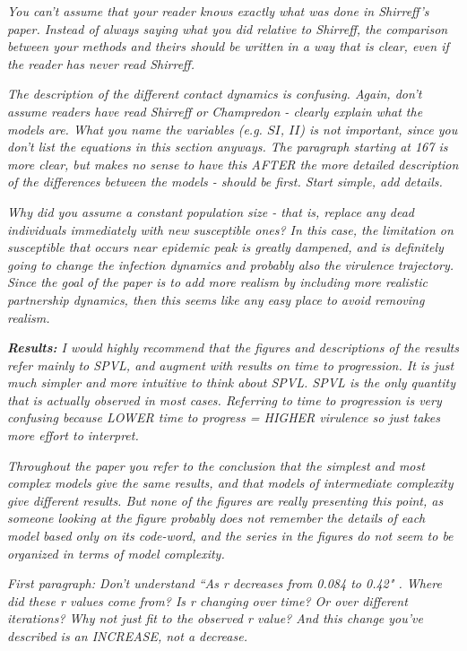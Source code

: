 \documentclass[10pt]{letter}
\newcommand{\revcomment}[1]{\emph{#1}}
\begin{document}
\begin{letter}{
}
\revcomment{
You can’t assume that your reader knows exactly what was done in Shirreff’s paper. Instead of always saying what you did relative to Shirreff, the comparison between your methods and theirs should be written in a way that is clear, even if the reader has never read Shirreff.
}

\revcomment{
The description of the different contact dynamics is confusing. Again, don’t assume readers have read Shirreff or Champredon - clearly explain what the models are. What you name the variables (e.g. $SI$, $II$) is not important, since you don’t list the equations in this section anyways. The paragraph starting at 167 is more clear, but makes no sense to have this AFTER the more detailed description of the differences between the models - should be first. Start simple, add details.
}

\revcomment{
Why did you assume a constant population size - that is, replace any dead individuals immediately with new susceptible ones? In this case, the limitation on susceptible that occurs near epidemic peak is greatly dampened, and is definitely going to change the infection dynamics and probably also the virulence trajectory. Since the goal of the paper is to add more realism by including more realistic partnership dynamics, then this seems like any easy place to avoid removing realism.
}

\revcomment{\textbf{Results:}
I would highly recommend that the figures and descriptions of the results refer mainly to SPVL, and augment with results on time to progression. It is just much simpler and more intuitive to think about SPVL. SPVL is the only quantity that is actually observed in most cases. Referring to time to progression is very confusing because LOWER time to progress = HIGHER virulence so just takes more effort to interpret.
}

\revcomment{
Throughout the paper you refer to the conclusion that the simplest and most complex models give the same results, and that models of intermediate complexity give different results. But none of the figures are really presenting this point, as someone looking at the figure probably does not remember the details of each model based only on its code-word, and the series in the figures do not seem to be organized in terms of model complexity.
}

\revcomment{
First paragraph: Don’t understand “As r decreases from 0.084 to 0.42" . Where did these r values come from? Is r changing over time? Or over different iterations? Why not just fit to the observed r value? And this change you’ve described is an INCREASE, not a decrease.
}


\end{letter}
\end{document}
